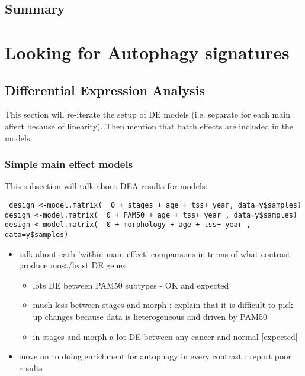   
    
    

    
    
    \subsection{Summary}

\section{Looking for Autophagy signatures}

    \subsection{Differential Expression Analysis}
        This section will re-iterate the setup of DE models (i.e. separate for each main affect because of linearity). Then mention that batch effects are included in the models. 
        \subsubsection{Simple main effect models}
        This subsection will talk about DEA results for models: 
        
       \texttt{ design <-model.matrix(~ 0 + stages + age + tss+ year, data=y\$samples)\\
        design <-model.matrix(~ 0 + PAM50 + age + tss+ year , data=y\$samples)\\
        design <-model.matrix(~ 0 + morphology + age + tss+ year , data=y\$samples)\\}
    
        \begin{itemize}
          \item talk about each 'within main effect' comparisons in terms of what contrast produce most/least DE genes
                 \begin{itemize}
                     \item lots DE between PAM50 subtypes - OK and expected
                     \item much less between stages and morph : explain that it is difficult to pick up changes because data is heterogeneous and driven by PAM50
                     \item  in stages and morph a lot DE between any cancer and normal [expected]
               \end{itemize}
            \item move on to doing enrichment for autophagy in every contrast : report poor results
        \end{itemize}
        
